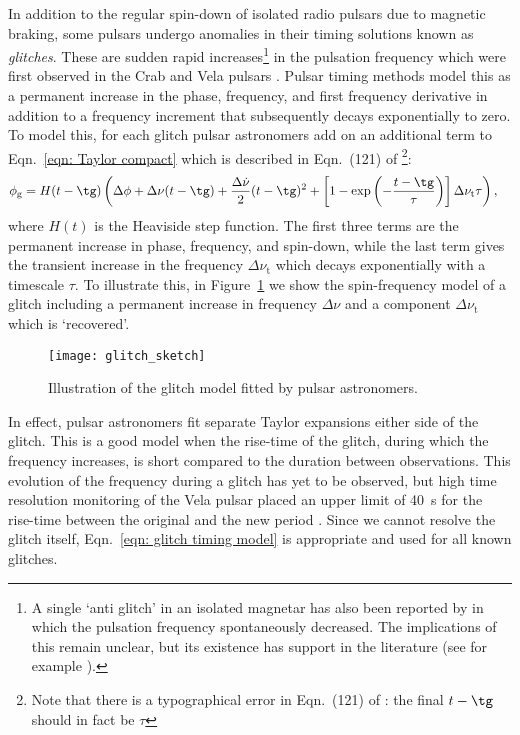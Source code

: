 In addition to the regular spin-down of isolated radio pulsars due to magnetic
braking,
some pulsars undergo anomalies in their timing solutions known as
\emph{glitches}.  These are sudden rapid increases\footnote{A single `anti glitch'
in an isolated magnetar has also been reported by \citet{archibald2013anti} in
which the pulsation frequency spontaneously decreased. The implications of this
remain unclear, but its existence has support in the literature (see for example
\citet{hu2014glitch}).}
 in the pulsation frequency
which were first observed in the Crab \citep{Boynton1969, Richards1969} and
Vela pulsars \citep{RadhakrishnanManchester1969, Reichley1969}. Pulsar
timing methods model this as a permanent increase in the phase, frequency, and
first frequency derivative in addition to a frequency increment that
subsequently decays exponentially to zero.  To model this,
for each glitch pulsar astronomers add on an additional term to
Eqn.~\eqref{eqn: Taylor compact} which is described in
Eqn.~(121) of \citet{Edwards2006}\footnote{Note that there is a typographical
error in Eqn.~(121) of \citet{Edwards2006}: the final $t-\tg$ should in fact
be $\tau$}:
\begin{align}
\begin{split}
\phi_{\textrm{g}} = H(t - \tg)& {}\left(
\Delta\phi + \Delta\nu(t - \tg) + \frac{\Delta\dot{\nu}}{2}(t - \tg)^{2}
+ \left[1-\exp\left(-\frac{t - \tg}{\tau}\right)\right]
\Delta\nu_{\textrm{t}}\tau
\right),
\end{split}
\label{eqn: glitch timing model}
\end{align}
where $H(t)$ is the Heaviside step function. The first
three terms are the permanent increase in phase, frequency, and spin-down,
while the last term gives the transient increase in the frequency
$\Delta\nu_{\textrm{t}}$ which decays exponentially with a timescale $\tau$.
To illustrate this, in Figure~\ref{fig: glitch sketch} we show the spin-frequency
model of a glitch including a permanent increase in frequency $\Delta\nu$ and
a component $\Delta\nu_{\textrm{t}}$ which is `recovered'.
\begin{figure}[htb]
\centering
\texttt{[image: glitch\_sketch]}
\caption{Illustration of the glitch model fitted by pulsar astronomers.}
\label{fig: glitch sketch}
\end{figure}

In effect, pulsar astronomers fit separate Taylor expansions either side of the
glitch. This is a good model when the rise-time of the glitch, during which the
frequency increases, is short compared to the duration between observations.
This evolution of the frequency during a glitch has yet to be observed, but
high time resolution monitoring of the Vela pulsar placed an upper limit of
40~s for the rise-time between the original and the new period
\citep{dodson2001}. Since we cannot resolve the glitch itself,
Eqn.~\eqref{eqn: glitch timing model} is appropriate and used for all known
glitches.


